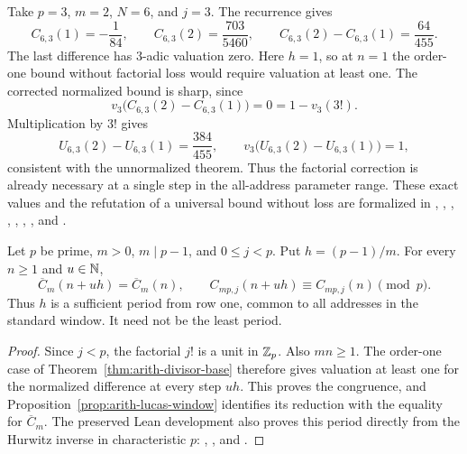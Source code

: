 \begin{example}
\label{ex:arith-normalization-loss}
Take $p=3$, $m=2$, $N=6$, and $j=3$.  The recurrence gives
\[
 C_{6,3}(1)=-\frac1{84},\qquad
 C_{6,3}(2)=\frac{703}{5460},\qquad
 C_{6,3}(2)-C_{6,3}(1)=\frac{64}{455}.
\]
The last difference has $3$-adic valuation zero.  Here $h=1$, so at
$n=1$ the order-one bound without factorial loss would require valuation
at least one.  The corrected normalized bound is sharp, since
\[
 v_3\bigl(C_{6,3}(2)-C_{6,3}(1)\bigr)=0=1-v_3(3!).
\]
Multiplication by $3!$ gives
\[
 U_{6,3}(2)-U_{6,3}(1)=\frac{384}{455},\qquad
 v_3\bigl(U_{6,3}(2)-U_{6,3}(1)\bigr)=1,
\]
consistent with the unnormalized theorem.  Thus the factorial correction
is already necessary at a single step in the all-address parameter range.
These exact values and the refutation of a universal bound without loss
are formalized in
,
,
,
,
,
,
, and
.
\end{example}

\begin{corollary}
\label{cor:arith-window-period}
Let $p$ be prime, $m>0$, $m\mid p-1$, and $0\le j<p$.  Put
$h=(p-1)/m$.  For every $n\ge1$ and $u\in\mathbb N$,
\[
 \overline C_m(n+uh)=\overline C_m(n),\qquad
 C_{mp,j}(n+uh)\equiv C_{mp,j}(n)\pmod p.
\]
Thus $h$ is a sufficient period from row one, common to all addresses
in the standard window.  It need not be the least period.
\end{corollary}

\begin{proof}
Since $j<p$, the factorial $j!$ is a unit in $\mathbb Z_p$.  Also $mn\ge1$.
The order-one case of Theorem~\ref{thm:arith-divisor-base} therefore gives
valuation at least one for the normalized difference at every step $uh$.
This proves the congruence, and Proposition~\ref{prop:arith-lucas-window}
identifies its reduction with the equality for $\overline C_m$.
The preserved Lean development also proves this period directly from the
Hurwitz inverse in characteristic $p$:
,
, and
.
\end{proof}

